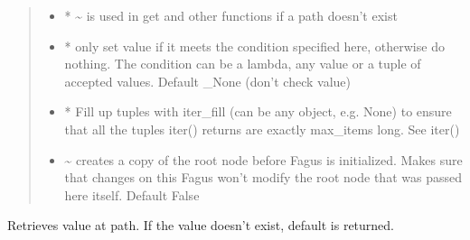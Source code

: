 \documentclass[a4paper,10pt,english]{sphinxmanual}
\begin{document}
\begin{fulllineitems}
\begin{fulllineitems}
\begin{quote}
\begin{description}
\begin{itemize}
\item {}
\sphinxAtStartPar
{} \textendash{} * \textasciitilde{} is used in get and other functions if a path doesn’t exist

\item {}
\sphinxAtStartPar
{} \textendash{} * only set value if it meets the condition specified here, otherwise do nothing. The condition can be
a lambda, any value or a tuple of accepted values. Default \_None (don’t check value)

\item {}
\sphinxAtStartPar
{} \textendash{} * Fill up tuples with iter\_fill (can be any object, e.g. None) to ensure that all the tuples
iter() returns are exactly max\_items long. See iter()

\item {}
\sphinxAtStartPar
{} \textendash{} \textasciitilde{} creates a copy of the root node before Fagus is initialized. Makes sure that changes on this Fagus
won’t modify the root node that was passed here itself. Default False

\end{itemize}

\end{description}\end{quote}

\end{fulllineitems}


\begin{fulllineitems}
\label{\detokenize{fagus.fagus:fagus.fagus.Fagus.get}}
\pysigstartsignatures
{}
\pysigstopsignatures
\sphinxAtStartPar
Retrieves value at path. If the value doesn’t exist, default is returned.


\end{fulllineitems}
\end{fulllineitems}
\end{document}
